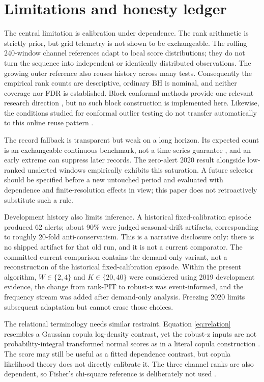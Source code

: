 \section{Limitations and honesty ledger}

The central limitation is calibration under dependence. The rank arithmetic is
strictly prior, but grid telemetry is not shown to be exchangeable. The rolling
240-window channel references adapt to local score distributions; they do not
turn the sequence into independent or identically distributed observations.
The growing outer reference also reuses history across many tests. Consequently
the empirical rank counts are descriptive, ordinary BH is nominal, and neither
coverage nor FDR is established. Block conformal methods provide one relevant
research direction \citep{chernozhukov2018dependentconformal}, but no such block
construction is implemented here. Likewise, the conditions studied for
conformal outlier testing do not transfer automatically to this online reuse
pattern \citep{bates2023conformaloutliers}.

The record fallback is transparent but weak on a long horizon. Its expected
count is an exchangeable-continuous benchmark, not a time-series guarantee
\citep{renyi1962records}, and an early extreme can suppress later records. The
zero-alert 2020 result alongside low-ranked unalerted windows empirically
exhibits this saturation. A future selector should be specified before a new
untouched period and evaluated with dependence and finite-resolution effects in
view; this paper does not retroactively substitute such a rule.

Development history also limits inference. A historical fixed-calibration
episode produced 62 alerts; about 90\% were judged seasonal-drift artifacts,
corresponding to roughly 20-fold anti-conservatism. This is a narrative
disclosure only: there is no shipped artifact for that old run, and it is not a
current comparator. The committed current comparison contains the demand-only
variant, not a reconstruction of the historical fixed-calibration episode.
Within the present algorithm, $W\in\{2,4\}$ and $K\in\{20,40\}$ were considered
using 2019 development evidence, the change from rank-PIT to robust-z was
event-informed, and the frequency stream was added after demand-only analysis.
Freezing 2020 limits subsequent adaptation but cannot erase those choices.

The relational terminology needs similar restraint. Equation
\ref{eq:relation} resembles a Gaussian copula log-density contrast, yet the
robust-z inputs are not probability-integral transformed normal scores as in a
literal copula construction \citep{sklar1959fonctions,song2000gaussiancopula}.
The score may still be useful as a fitted dependence contrast, but copula
likelihood theory does not directly calibrate it. The three channel ranks are
also dependent, so Fisher's chi-square reference is deliberately not used
\citep{fisher1932statisticalmethods}.

